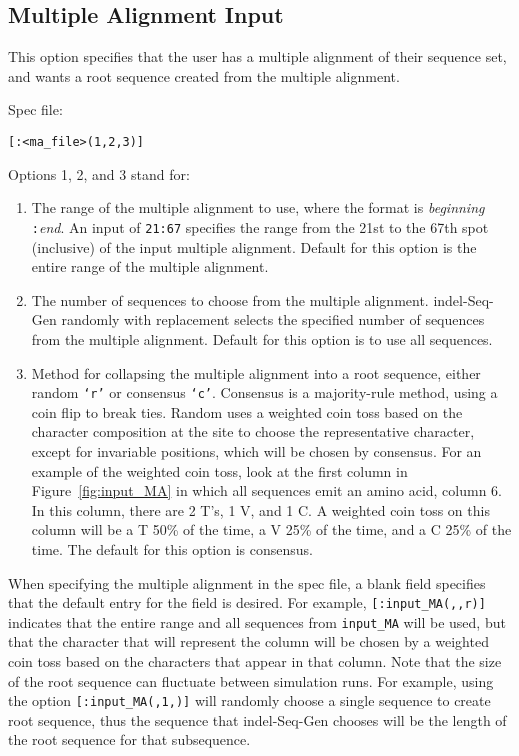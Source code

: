 \documentclass[10pt]{article}
\begin{document}
\subsection{Multiple Alignment Input}

This option specifies that the user has a multiple alignment of their sequence set, and
wants a root sequence created from the multiple alignment.

Spec file:
\begin{verbatim}
[:<ma_file>(1,2,3)]
\end{verbatim}

Options 1, 2, and 3 stand for:
\begin{enumerate}
\item The range of the multiple alignment to use, where the format is {\it beginning}{\tt
:}{\it end}.  An input of {\tt 21:67} specifies the range from the 21st to the 67th spot
(inclusive) of the input multiple alignment.  Default for this option is the entire range of the multiple alignment.
\item The number of sequences to choose from the multiple alignment.  indel-Seq-Gen randomly with replacement selects the specified number of sequences from the multiple alignment. Default for this option is to use all sequences.
\item Method for collapsing the multiple alignment into a root sequence, either random
{\tt `r'} or consensus {\tt `c'}.  Consensus is a majority-rule method, using a coin flip to break ties.  Random uses a weighted coin toss based on the character composition at the site to choose the representative character, except for invariable positions, which will be chosen by consensus. For an example of the weighted coin toss, look at the first column in Figure~\ref{fig:input_MA} in which all sequences emit an amino acid, column 6.  In this
column, there are 2 T's, 1 V, and 1 C.  A weighted coin toss on this column will be a T 50\% of the time, a V 25\% of the time, and a C 25\% of the time. The default for this option is consensus.
\end{enumerate}

When specifying the multiple alignment in the spec file, a blank field specifies that the default entry for the field is desired.  For example, \verb+[:input_MA(,,r)]+ indicates that the entire range and all sequences from {\tt input\_MA} will be used, but that the character that will represent the column will be chosen by a weighted coin toss based on the characters that appear in that column.  Note that the size of the root sequence can fluctuate between simulation runs.  For example, using the option \verb+[:input_MA(,1,)]+ will randomly choose a single sequence to create root sequence, thus the sequence that
indel-Seq-Gen chooses will be the length of the root sequence for that subsequence.\\
\end{document}
